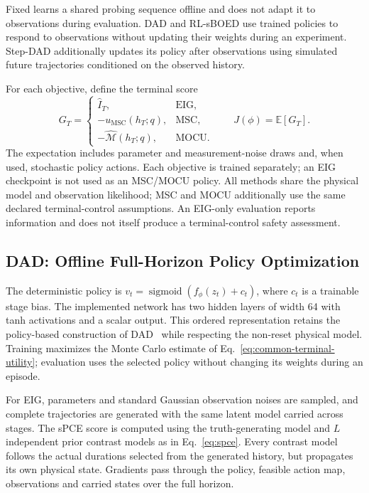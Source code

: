 \documentclass[journal]{IEEEtran}
\newcommand{\E}{\mathbb{E}}
\begin{document}
Fixed learns a shared probing sequence offline and does not adapt it to
observations during evaluation. DAD and RL-sBOED use trained policies to
respond to observations without updating their weights during an experiment.
Step-DAD additionally updates its policy after observations using simulated
future trajectories conditioned on the observed history.

For each objective, define the terminal score
\begin{equation}
G_T=\begin{cases}
\widehat I_T, & \text{EIG},\\
-u_{\mathrm{MSC}}(h_T;q), & \text{MSC},\\
-\widehat{\mathcal M}(h_T;q), & \text{MOCU}.
\end{cases}
\qquad J(\phi)=\E[G_T].
\label{eq:common-terminal-utility}
\end{equation}
The expectation includes parameter and measurement-noise draws and, when
used, stochastic policy actions. Each objective is trained separately; an EIG
checkpoint is not used as an MSC/MOCU policy.
All methods share the physical model and observation likelihood; MSC and
MOCU additionally use the same declared terminal-control assumptions.
An EIG-only evaluation reports information and does not itself produce a
terminal-control safety assessment.

\subsection{DAD: Offline Full-Horizon Policy Optimization}
The deterministic policy is
$v_t=\operatorname{sigmoid}(f_\phi(z_t)+c_t)$, where $c_t$ is a trainable
stage bias. The implemented network has two hidden layers of width 64 with
tanh activations and a scalar output. This ordered representation retains the
policy-based construction of DAD~\cite{foster2021dad} while respecting the
non-reset physical model. Training maximizes the Monte Carlo estimate of
Eq.~\eqref{eq:common-terminal-utility}; evaluation uses the selected policy
without changing its weights during an episode.

For EIG, parameters and standard Gaussian observation noises are sampled,
and complete trajectories are generated with the same latent model carried
across stages. The sPCE score is computed using the truth-generating model and
$L$ independent prior contrast models as in Eq.~\eqref{eq:spce}. Every contrast
model follows the actual durations selected from the generated history, but
propagates its own physical state. Gradients pass through the policy, feasible
action map, observations and carried states over the full horizon.
\end{document}
